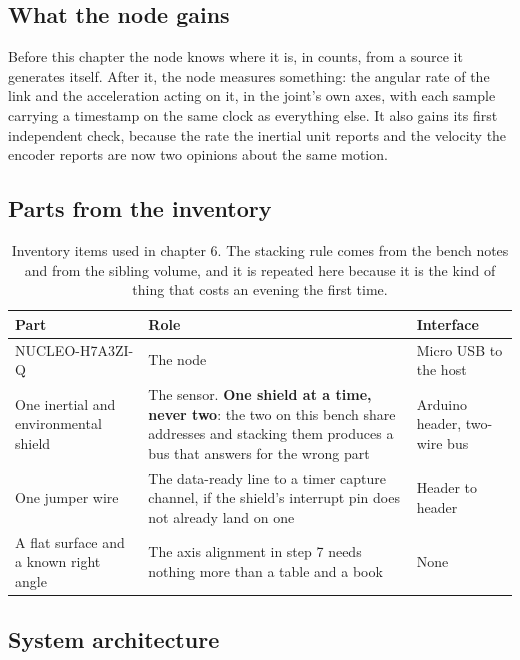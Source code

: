 \subsection*{What the node gains}

Before this chapter the node knows where it is, in counts, from a source it
generates itself. After it, the node measures something: the angular rate of the
link and the acceleration acting on it, in the joint's own axes, with each
sample carrying a timestamp on the same clock as everything else. It also gains
its first independent check, because the rate the inertial unit reports and the
velocity the encoder reports are now two opinions about the same motion.

\subsection*{Parts from the inventory}

\begin{table}[H]\centering\small
\begin{tabular}{p{40mm}p{66mm}p{40mm}}
\toprule
Part & Role & Interface \\
\midrule
NUCLEO-H7A3ZI-Q & The node & Micro USB to the host \\
One inertial and environmental shield & The sensor. \textbf{One shield at a time, never two}: the two on this bench share addresses and stacking them produces a bus that answers for the wrong part & Arduino header, two-wire bus \\
One jumper wire & The data-ready line to a timer capture channel, if the shield's interrupt pin does not already land on one & Header to header \\
A flat surface and a known right angle & The axis alignment in step 7 needs nothing more than a table and a book & None \\
\bottomrule
\end{tabular}
\caption{Inventory items used in chapter 6. The stacking rule comes from the bench notes and from the sibling volume, and it is repeated here because it is the kind of thing that costs an evening the first time.}
\end{table}

\subsection*{System architecture}


